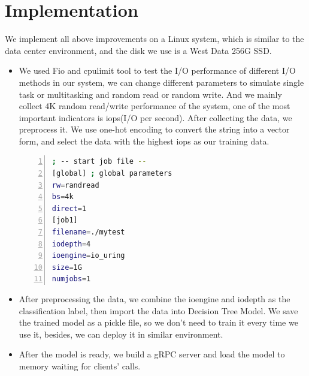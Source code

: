 \documentclass[conference]{IEEEtran}
\begin{document}
\section{Implementation}
We implement all above improvements on a Linux system, which is similar to the data center environment, and the disk we use is a West Data 256G SSD.
\begin{itemize}

	\item We used Fio and cpulimit tool to test the I/O performance of different I/O methods in our system,
	 we can change different parameters to simulate single task or multitasking and random read or random write.
	 And we mainly collect 4K random read/write performance of the system, one of the most important indicators is iops(I/O per second).
	 After collecting the data, we preprocess it. We use one-hot encoding to convert the string into a vector form, and select the data with the highest iops as our training data.


	      \begin{lstlisting}[language={bash},
		basicstyle=\normalsize\menlo,
        numbers=left]
; -- start job file --
[global] ; global parameters
rw=randread 
bs=4k
direct=1
[job1]
filename=./mytest
iodepth=4
ioengine=io_uring
size=1G
numjobs=1
\end{lstlisting}

	\item After preprocessing the data, we combine the ioengine and iodepth as the classification label, then import the data into Decision Tree Model. 
	We save the trained model as a pickle file, so we don't need to train it every time we use it, besides, we can deploy it in similar environment.
	\item After the model is ready, we build a gRPC server and load the model to memory waiting for clients' calls.
\end{itemize}
\end{document}
